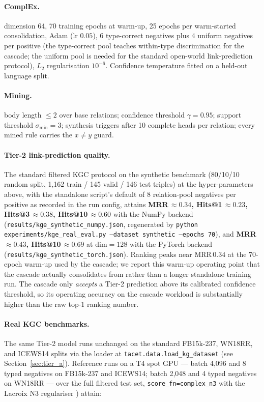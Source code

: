 \documentclass[11pt]{article}
\theoremstyle{plain}
\begin{document}
\paragraph{ComplEx.} dimension 64, 70 training epochs at warm-up, 25 epochs
per warm-started consolidation, Adam (lr $0.05$), 6 type-correct negatives
plus 4 uniform negatives per positive (the type-correct pool teaches
within-type discrimination for the cascade; the uniform pool is needed for
the standard open-world link-prediction protocol), $L_2$ regularisation
$10^{-6}$. Confidence temperature fitted on a held-out language split.

\paragraph{Mining.} body length $\le 2$ over base relations; confidence
threshold $\gamma=0.95$; support threshold $\sigma_{\mathrm{min}}=3$; synthesis triggers
after 10 complete heads per relation; every mined rule carries the
$x\neq y$ guard.

\paragraph{Tier-2 link-prediction quality.} The standard filtered KGC
protocol on the synthetic benchmark (80/10/10 random split, 1{,}162 train /
145 valid / 146 test triples) at the hyper-parameters above, with the
standalone script's default of $8$ relation-pool negatives per positive as
recorded in the run config, attains
\textbf{MRR\,$\approx 0.34$, Hits@1\,$\approx 0.23$, Hits@3\,$\approx 0.38$,
Hits@10\,$\approx 0.60$} with the NumPy backend
(\texttt{results/kge\_synthetic\_numpy.json}, regenerated by
\texttt{python experiments/kge\_real\_eval.py --dataset synthetic --epochs 70}),
and \textbf{MRR\,$\approx 0.43$, Hits@10\,$\approx 0.69$} at $\mathrm{dim}=128$
with the PyTorch backend (\texttt{results/kge\_synthetic\_torch.json}).
Ranking peaks near MRR\,$0.34$ at the 70-epoch warm-up used by the cascade; we
report this warm-up operating point that the cascade actually consolidates from
rather than a longer standalone training run.
The cascade only \emph{accepts} a Tier-2 prediction above its calibrated
confidence threshold, so its operating accuracy on the cascade workload is
substantially higher than the raw top-1 ranking number.

\paragraph{Real KGC benchmarks.}
The same Tier-2 model runs unchanged on the standard FB15k-237,
WN18RR, and ICEWS14 splits via the loader at
\texttt{tacet.data.load\_kg\_dataset} (see
Section~\ref{sec:tier_a}).  Reference runs on a T4 spot GPU
--- batch 4{,}096 and 8 typed negatives on FB15k-237 and ICEWS14;
batch 2{,}048 and 4 typed negatives on WN18RR --- over the full filtered
test set, \texttt{score\_fn=complex\_n3} with the Lacroix N3 regulariser
\cite{lacroix2018complex_n3}) attain:
\end{document}
